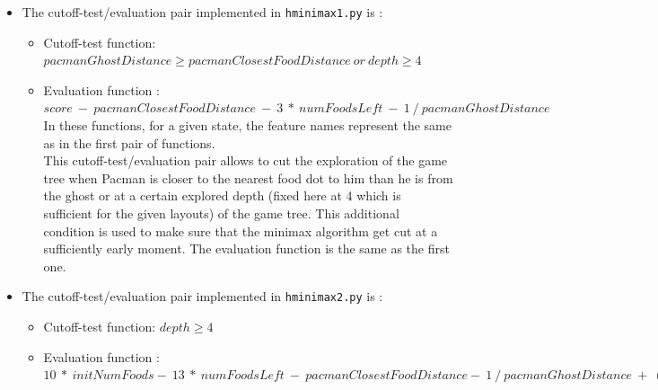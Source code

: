\documentclass{article}
\begin{document}
\begin{enumerate}[label=\alph*.,leftmargin=*]
\begin{itemize}
\begin{itemize}
					This cutoff-test/evaluation pair allows to cut the exploration of the game tree when Pacman is closer to the nearest food dot to him than the ghost is or at a certain explored depth (fixed here at 4 which is sufficient for the given layouts) of the game tree. This additional condition is used to make sure that the minimax algorithm get cut at a sufficiently early moment. This pair allows us to evaluate a state in this way : the higher score, the better, the closest Pacman to a food dot is, the better, the less food dots, the better, and the farthest Pacman is from the ghost, the better. The evaluation function is a linear combination of these characteristics allowing to choose a certain weight for each of them as a coefficient.\\
				\end{itemize} 

			\item The cutoff-test/evaluation pair implemented in \texttt{hminimax1.py} is :
				\begin{itemize}
					\item Cutoff-test function: $pacmanGhostDistance \geq pacmanClosestFoodDistance \ or \ depth \geq 4$
					\item Evaluation function : $score \ - \ pacmanClosestFoodDistance \ - \ 3 \ * \ numFoodsLeft \ - \ 1 \ / \ pacmanGhostDistance$\\
				
					In these functions, for a given state, the feature names represent the same as in the first pair of functions.\\
				
					This cutoff-test/evaluation pair allows to cut the exploration of the game tree when Pacman is closer to the nearest food dot to him than he is from the ghost or at a certain explored depth (fixed here at 4 which is sufficient for the given layouts) of the game tree. This additional condition is used to make sure that the minimax algorithm get cut at a sufficiently early moment. The evaluation function is the same as the first one.\\
				\end{itemize}

			\item The cutoff-test/evaluation pair implemented in \texttt{hminimax2.py} is :
				\begin{itemize}
					\item Cutoff-test function: $depth \geq 4$
					\item Evaluation function : $10 \ * \ initNumFoods - \ 13 \ * \ numFoodsLeft \ - \ pacmanClosestFoodDistance - \ 1 \ / \ pacmanGhostDistance \ + \ (500 \ if \ winning \ end) \ + \ (-500 \ if \ losing \ end)$ \\
				

\end{itemize}
\end{itemize}
\end{enumerate}
\end{document}

